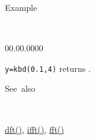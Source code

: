 \begin{description}
\item [Example]~
\end{description}
\begin{lyxlist}{00.00.0000}
\item [\texttt{y=kbd(0.1,4)}]returns .
\end{lyxlist}
\begin{description}
\item [See~also]~
\end{description}
\textcolor{blue}{\hyperlink{dft}{dft()}}\textcolor{black}{,} \textcolor{blue}{\hyperlink{ifft}{ifft()}}\textcolor{black}{,}
\textcolor{blue}{\hyperlink{fft}{fft()}}
